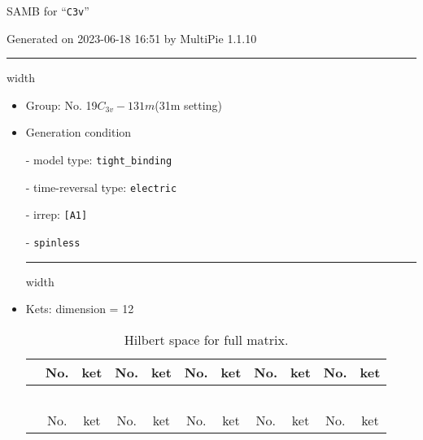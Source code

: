 \documentclass[fleqn,10pt,landscape]{article}
\begin{document}
\setcounter{MaxMatrixCols}{16}

\setlength{\baselineskip}{16pt}
\footnotesize
\begin{center}
\LARGE
SAMB for ``\texttt{C3v}''
\end{center}
\begin{flushright}
Generated on 2023-06-18 16:51 by MultiPie 1.1.10
\end{flushright}
\vspace{1cm}


 \hfil \hrule height 1mm width \textwidth \hfil

\begin{itemize}
\item Group: No. 19\quad$C_{3v}-1$\quad$31m$\quad(31m setting)\quad[ trigonal ]

\vspace{5mm}

\item Generation condition

\quad - model type: \texttt{tight_binding}

\quad - time-reversal type: \texttt{electric}

\quad - irrep: \texttt{[A1]}

\quad - \texttt{spinless}


 \hfil \hrule height 1mm width \textwidth \hfil

\item Kets: dimension = 12
\begin{center}
\renewcommand{\arraystretch}{1.3}
\begin{longtable}{c|cc|cc|cc|cc|cc}
\caption{Hilbert space for full matrix.}
 \\
 \hline \hline
 & No. & ket & No. & ket & No. & ket & No. & ket & No. & ket \\ \hline \endfirsthead

\multicolumn{10}{l}{\tablename\ \thetable{}} \\
 \hline \hline
 & No. & ket & No. & ket & No. & ket & No. & ket & No. & ket \\ \hline \endhead


\end{longtable}
\end{center}
\end{itemize}
\end{document}
